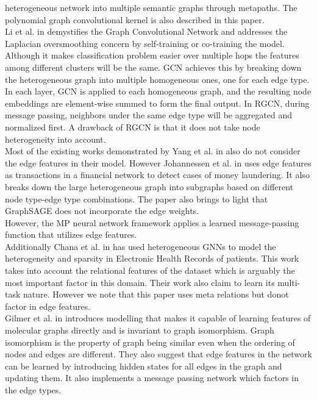 \documentclass{report} %
\begin{document}
heterogeneous network into multiple semantic graphs through metapaths. The polynomial graph convolutional kernel is also described in this paper.\\ 
Li et al. in \cite{GCN-2018} demystifies the Graph Convolutional Network and addresses the Laplacian oversmoothing concern by self-training or co-training the model.
Although it makes classification problem easier over multiple hops the features among different clusters will be the same.
GCN achieves this by breaking down the heterogeneous graph into multiple homogeneous ones, one for each edge type. 
In each layer, GCN is applied to each homogeneous graph, and the resulting node embeddings are element-wise summed to form the final output. 
In RGCN, during message passing, neighbors under the same edge type will be aggregated and normalized first. 
A drawback of RGCN is that it does not take node heterogeneity into account. \\
Most of the existing works demonstrated by Yang et al. in \cite{HGNN-2020} also do not consider the edge features in their model. 
However Johannessen et al. in \cite{ML HGNN-2023} uses edge features as transactions in a financial network to detect cases of money laundering.
It also breaks down the large heterogeneous graph into subgraphs based on different node type-edge type combinations. 
The paper also brings to light that GraphSAGE does not incorporate the edge weights.\\
However, the \ac{MP} neural network framework applies a learned message-passing function that utilizes edge features.\\
Additionally Chana et al. in \cite{EHR HGNN-2024} has used heterogeneous \ac{GNN}s to model the heterogeneity and sparsity in Electronic 
Health Records of patients. This work takes into account the relational features of the dataset which is arguably the most important factor in this domain. 
Their work also claim to learn its multi-task nature. However we note that this paper uses meta relations but donot factor in edge features.\\
Gilmer et al. in \cite{QC-MP-2017} introduces modelling that makes it capable of learning features of molecular graphs directly and is 
invariant to graph isomorphism. Graph isomorphism is the property of graph being similar even when the ordering of nodes and edges are different.
They also suggest that edge features in the network can be learned by introducing hidden states for all edges in the graph and updating them.
It also implements a message passing network which factors in the edge types.\\
\end{document}

